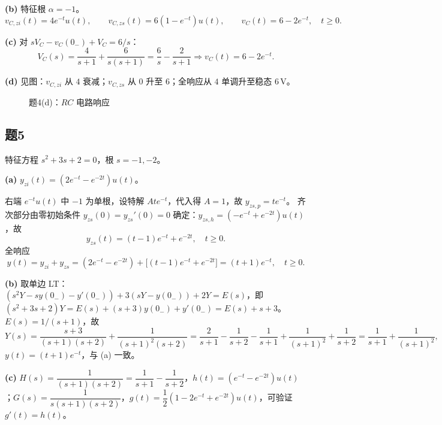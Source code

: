 \documentclass[11pt,a4paper]{ctexart}
\begin{document}
\textbf{(b)} 特征根 $\alpha=-1$。
\[
v_{C,zi}(t)=4e^{-t}u(t),\qquad
v_{C,zs}(t)=6(1-e^{-t})u(t),\qquad
v_C(t)=6-2e^{-t},\quad t\ge 0.
\]

\textbf{(c)} 对 $sV_C-v_C(0_-)+V_C=6/s$：
\[
V_C(s)=\frac{4}{s+1}+\frac{6}{s(s+1)}=\frac{6}{s}-\frac{2}{s+1}
\Rightarrow v_C(t)=6-2e^{-t}.
\]

\textbf{(d)} 见图：$v_{C,zi}$ 从 $4$ 衰减；$v_{C,zs}$ 从 $0$ 升至 $6$；全响应从 $4$ 单调升至稳态 $6\,\mathrm{V}$。

\begin{figure}[htbp]
\centering
{}
\caption{题4(d)：$RC$ 电路响应}
\end{figure}

\subsection*{题5}

特征方程 $s^2+3s+2=0$，根 $s=-1,-2$。

\textbf{(a)} $y_{zi}(t)=(2e^{-t}-e^{-2t})u(t)$。

右端 $e^{-t}u(t)$ 中 $-1$ 为单根，设特解 $Ate^{-t}$，代入得 $A=1$，故 $y_{zs,p}=te^{-t}$。
齐次部分由零初始条件 $y_{zs}(0)=y_{zs}'(0)=0$ 确定：$y_{zs,h}=(-e^{-t}+e^{-2t})u(t)$，故
\[
y_{zs}(t)=(t-1)e^{-t}+e^{-2t},\quad t\ge 0.
\]
全响应
\[
y(t)=y_{zi}+y_{zs}=(2e^{-t}-e^{-2t})+\bigl[(t-1)e^{-t}+e^{-2t}\bigr]=(t+1)e^{-t},\quad t\ge 0.
\]

\textbf{(b)} 取单边 LT：$(s^2Y-sy(0_-)-y'(0_-))+3(sY-y(0_-))+2Y=E(s)$，即
$(s^2+3s+2)Y=E(s)+(s+3)y(0_-)+y'(0_-)=E(s)+s+3$。$E(s)=1/(s+1)$，故
\[
Y(s)=\frac{s+3}{(s+1)(s+2)}+\frac{1}{(s+1)^2(s+2)}
     =\frac{2}{s+1}-\frac{1}{s+2}-\frac{1}{s+1}+\frac{1}{(s+1)^2}+\frac{1}{s+2}
     =\frac{1}{s+1}+\frac{1}{(s+1)^2},
\]
$y(t)=(t+1)e^{-t}$，与 (a) 一致。

\textbf{(c)} $H(s)=\dfrac{1}{(s+1)(s+2)}=\dfrac{1}{s+1}-\dfrac{1}{s+2}$，$h(t)=(e^{-t}-e^{-2t})u(t)$；$G(s)=\dfrac{1}{s(s+1)(s+2)}$，$g(t)=\dfrac{1}{2}(1-2e^{-t}+e^{-2t})u(t)$，可验证 $g'(t)=h(t)$。
\end{document}
